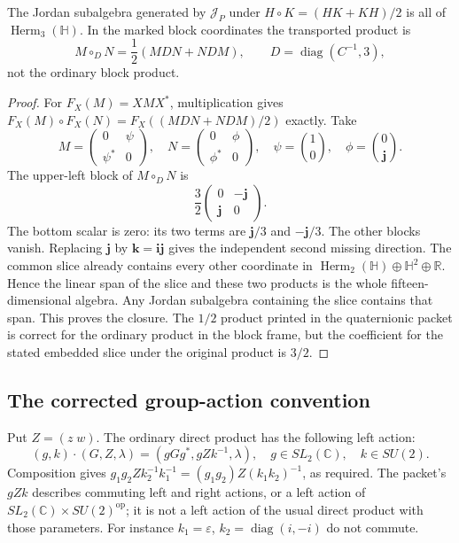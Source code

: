 \begin{theorem}\label{q444:jordan}
The Jordan subalgebra generated by $\mathcal J_P$ under
$H\circ K=(HK+KH)/2$ is all of $\operatorname{Herm}_3(\mathbb H)$.
In the marked block coordinates the transported product is
\begin{equation}\label{q444:jordan-product}
 M\circ_D N=\frac12(MDN+NDM),\qquad D=\operatorname{diag}(C^{-1},3),
\end{equation}
not the ordinary block product.
\end{theorem}
\begin{proof}
For $F_X(M)=XMX^*$, multiplication gives
$F_X(M)\circ F_X(N)=F_X((MDN+NDM)/2)$ exactly.
Take
\[
 M=\begin{pmatrix}0&\psi\\\psi^*&0\end{pmatrix},\quad
 N=\begin{pmatrix}0&\phi\\\phi^*&0\end{pmatrix},\quad
 \psi=\binom10,\quad \phi=\binom0{\mathbf j}.
\]
The upper-left block of $M\circ_DN$ is
\[
 \frac32\begin{pmatrix}0&-\mathbf j\\\mathbf j&0\end{pmatrix}.
\]
The bottom scalar is zero: its two terms are
$\mathbf j/3$ and $-\mathbf j/3$. The other blocks vanish. Replacing
$\mathbf j$ by $\mathbf k=\mathbf i\mathbf j$ gives the independent
second missing direction. The common slice already contains every other
coordinate in $\operatorname{Herm}_2(\mathbb H)\oplus\mathbb H^2\oplus
\mathbb R$. Hence the linear span of the slice and these two products
is the whole fifteen-dimensional algebra. Any Jordan subalgebra containing
the slice contains that span. This proves the closure.
The $1/2$ product printed in the quaternionic packet is correct for the
ordinary product in the block frame, but the coefficient for the stated
embedded slice under the original product is $3/2$.
\end{proof}

\subsection{The corrected group-action convention}

Put $Z=(z\;w)$. The ordinary direct product has the following left action:
\begin{equation}\label{q444:action}
 (g,k)\cdot(G,Z,\lambda)=(gGg^*,gZk^{-1},\lambda),
 \quad g\in SL_2(\mathbb C),\quad k\in SU(2).
\end{equation}
Composition gives $g_1g_2Zk_2^{-1}k_1^{-1}
=(g_1g_2)Z(k_1k_2)^{-1}$, as required. The packet's $gZk$ describes
commuting left and right actions, or a left action of
$SL_2(\mathbb C)\times SU(2)^{\mathrm{op}}$; it is not a left action
of the usual direct product with those parameters. For instance
$k_1=\varepsilon$, $k_2=\operatorname{diag}(i,-i)$ do not commute.

